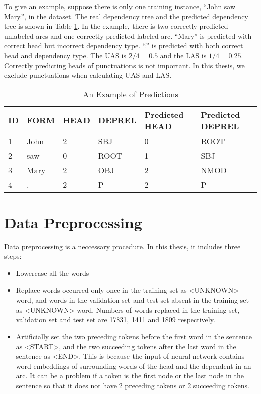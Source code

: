 To give an example, suppose there is only one training instance, ``John saw Mary.'', in the dataset. The real dependency tree and the predicted dependency tree is shown in Table \ref{tab:toy}. In the example, there is two correctly predicted unlabeled arcs and one correctly predicted labeled arc. ``Mary'' is predicted with  correct head but incorrect dependency type.  ``.'' is  predicted with both correct head and dependency type.  The UAS is $2/4=0.5$ and the LAS is $1/4=0.25$. Correctly predicting heads of punctuations is not important. In this thesis, we exclude punctuations when calculating UAS and LAS.

\begin{table}
\centering
    \begin{tabular}{@{}l l l l l l@{}} \toprule
    ID&FORM&HEAD&DEPREL&Predicted HEAD& Predicted DEPREL\\ \midrule
    1&John&2&SBJ&0&ROOT\\
    2&saw&0&ROOT&1&SBJ \\ 
    3&Mary&2&OBJ&2&NMOD\\ 
    4&.&2&P&2&P\\
    \bottomrule
    \end{tabular}
\caption{An Example of Predictions}\label{tab:toy}
\end{table}


\section{Data Preprocessing}
\label{sec:Data Preprocessing}
Data preprocessing is a neccessary procedure. In this thesis, it includes three steps: 
\begin{itemize}  
\item Lowercase all the words
\item Replace words occurred only once in the training set as <UNKNOWN> word, and words in the validation set and test set absent in the training set as <UNKNOWN> word. Numbers of words replaced in the training set, validation set and test set are 17831, 1411 and 1809 respectively.
\item Artificially set the two preceding tokens before the first word in the sentence as <START>, and the two succeeding tokens after the last word in the sentence as <END>. This is because the input of neural network contains word embeddings of surrounding words of the head and the dependent in an arc. It can be a problem if a token is the first node or the last node in the sentence so that it does not have 2 preceding tokens or 2 succeeding tokens.
\end{itemize}

